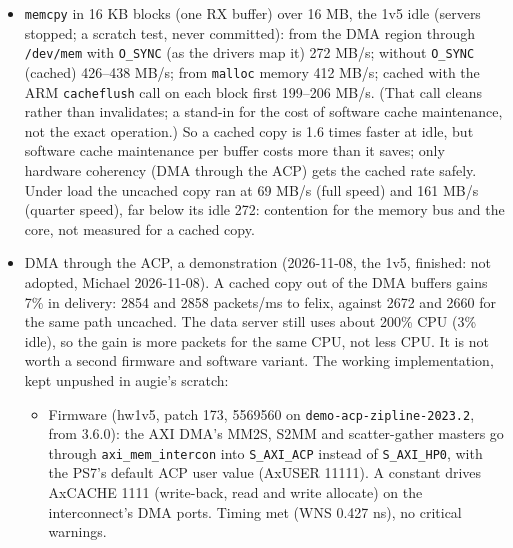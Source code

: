 \documentclass[11pt]{article}
\newcommand{\br}[1]{\texttt{#1}}
\newcommand{\h}[1]{\texttt{#1}}
\begin{document}
\begin{itemize}
  never committed;  pinned, felix subscriber).  Full speed (2699 packets/ms delivered, 64.8 MB/s):  the main thread
  spends 99.5\% of its wall time in \h{pacman\_poll\_rx}, 93\% in its \h{memcpy} out of the DMA buffers, which runs at
  69 MB/s;  the rest of the RX handling 6\%.  Quarter speed (1515):  \h{memcpy} at 161 MB/s, 23\% of the time.  The
  DMA buffers are mapped through \h{/dev/mem} with \h{O\_SYNC}:  uncached, so each word is a separate read from
  DRAM, slower still while the network interrupts share the core.  At the ceiling the data server is the uncached
  copy, not the ring handling.
\item \h{memcpy} in 16 KB blocks (one RX buffer) over 16 MB, the 1v5 idle (servers stopped;  a scratch test, never
  committed):  from the DMA region through \h{/dev/mem} with \h{O\_SYNC} (as the drivers map it) 272 MB/s;  without
  \h{O\_SYNC} (cached) 426--438 MB/s;  from \h{malloc} memory 412 MB/s;  cached with the ARM \h{cacheflush} call on
  each block first 199--206 MB/s.  (That call cleans rather than invalidates;  a stand-in for the cost of software
  cache maintenance, not the exact operation.)  So a cached copy is 1.6 times faster at idle, but software cache
  maintenance per buffer costs more than it saves;  only hardware coherency (DMA through the ACP) gets the cached rate
  safely.  Under load the uncached copy ran at 69 MB/s (full speed) and 161 MB/s (quarter speed), far below its idle
  272:  contention for the memory bus and the core, not measured for a cached copy.
\item DMA through the ACP, a demonstration (2026-11-08, the 1v5, finished:  not adopted, Michael 2026-11-08).  A
  cached copy out of the DMA buffers gains 7\% in delivery:  2854 and 2858 packets/ms to felix, against 2672 and
  2660 for the same path uncached.  The data server still uses about 200\% CPU (3\% idle), so the gain is more
  packets for the same CPU, not less CPU.  It is not worth a second firmware and software variant.  The working
  implementation, kept unpushed in augie's scratch:
  \begin{itemize}
  \item Firmware (hw1v5, patch 173, 5569560 on \br{demo-acp-zipline-2023.2}, from 3.6.0):  the AXI DMA's MM2S, S2MM
    and scatter-gather masters go through \h{axi\_mem\_intercon} into \h{S\_AXI\_ACP} instead of \h{S\_AXI\_HP0}, with
    the PS7's default ACP user value (AxUSER 11111).  A constant drives AxCACHE 1111 (write-back, read and write
    allocate) on the interconnect's DMA ports.  Timing met (WNS 0.427 ns), no critical warnings.

\end{itemize}
\end{itemize}
\end{document}
